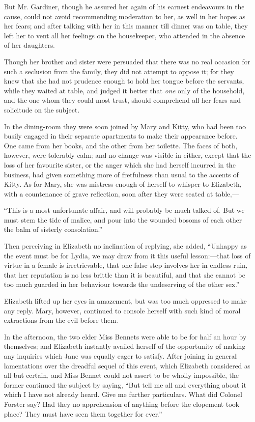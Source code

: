 \documentclass[12pt,openright]{book}
\begin{document}
But Mr. Gardiner, though he assured her again of his earnest endeavours in the cause, could not avoid recommending moderation to her, as well in her hopes as her fears; and after talking with her in this manner till dinner was on table, they left her to vent all her feelings on the housekeeper, who attended in the absence of her daughters.

Though her brother and sister were persuaded that there was no real occasion for such a seclusion from the family, they did not attempt to oppose it; for they knew that she had not prudence enough to hold her tongue before the servants, while they waited at table, and judged it better that \textit{one} only of the household, and the one whom they could most trust, should comprehend all her fears and solicitude on the subject.

In the dining-room they were soon joined by Mary and Kitty, who had been too busily engaged in their separate apartments to make their appearance before. One came from her books, and the other from her toilette. The faces of both, however, were tolerably calm; and no change was visible in either, except that the loss of her favourite sister, or the anger which she had herself incurred in the business, had given something more of fretfulness than usual to the accents of Kitty. As for Mary, she was mistress enough of herself to whisper to Elizabeth, with a countenance of grave reflection, soon after they were seated at table,—

“This is a most unfortunate affair, and will probably be much talked of. But we must stem the tide of malice, and pour into the wounded bosoms of each other the balm of sisterly consolation.”

Then perceiving in Elizabeth no inclination of replying, she added, “Unhappy as the event must be for Lydia, we may draw from it this useful lesson:—that loss of virtue in a female is irretrievable, that one false step involves her in endless ruin, that her reputation is no less brittle than it is beautiful, and that she cannot be too much guarded in her behaviour towards the undeserving of the other sex.”

Elizabeth lifted up her eyes in amazement, but was too much oppressed to make any reply. Mary, however, continued to console herself with such kind of moral extractions from the evil before them.

In the afternoon, the two elder Miss Bennets were able to be for half an hour by themselves; and Elizabeth instantly availed herself of the opportunity of making any inquiries which Jane was equally eager to satisfy. After joining in general lamentations over the dreadful sequel of this event, which Elizabeth considered as all but certain, and Miss Bennet could not assert to be wholly impossible, the former continued the subject by saying, “But tell me all and everything about it which I have not already heard. Give me further particulars. What did Colonel Forster say? Had they no apprehension of anything before the elopement took place? They must have seen them together for ever.”
\end{document}
